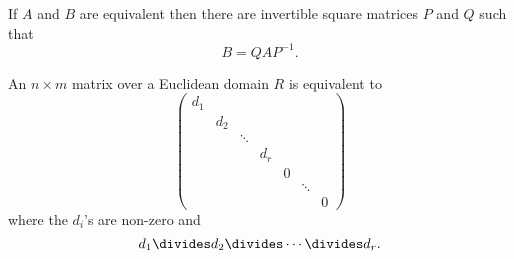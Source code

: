 \documentclass[a4paper]{article}
\theoremstyle{definition}
\begin{document}
If \(A\) and \(B\) are equivalent then there are invertible square matrices \(P\) and \(Q\) such that
\[
  B = QAP^{-1}.
\]

\begin{theorem}
  An \(n \times m\) matrix over a Euclidean domain \(R\) is equivalent to
  \[
    \begin{pmatrix}
      d_1 \\
      & d_2 \\
      & & \ddots \\
      & & & d_r \\
      & & & & 0 \\
      & & & & & \ddots \\
      & & & & & & 0
    \end{pmatrix}
  \]
  where the \(d_i\)'s are non-zero and
  \[
    d_1 \divides d_2 \divides \cdots \divides d_r.
  \]
\end{theorem}
\end{document}
